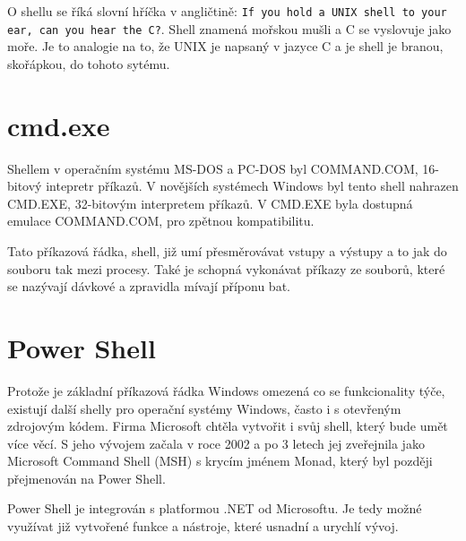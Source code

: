 \documentclass[thesis=M,czech]{FITthesis}[2012/06/26]
\begin{document}
O shellu se říká slovní hříčka v angličtině: \texttt{If you hold a UNIX shell to your ear, can you hear the C?}. Shell znamená mořskou mušli a C se vyslovuje jako moře. Je to analogie na to, že UNIX je napsaný v jazyce C a je shell je branou, skořápkou, do tohoto sytému.






\section{cmd.exe}

Shellem v operačním systému MS-DOS a PC-DOS byl COMMAND.COM, 16-bitový intepretr příkazů. V novějších systémech Windows byl tento shell nahrazen CMD.EXE, 32-bitovým interpretem příkazů. V CMD.EXE byla dostupná emulace COMMAND.COM, pro zpětnou kompatibilitu.

Tato příkazová řádka, shell, již umí přesměrovávat vstupy a výstupy a to jak do souboru tak mezi procesy. Také je schopná vykonávat příkazy ze souborů, které se nazývají dávkové a zpravidla mívají příponu bat.



\section{Power Shell}

Protože je základní příkazová řádka Windows omezená co se funkcionality týče, existují další shelly pro operační systémy Windows, často i s otevřeným zdrojovým kódem. Firma Microsoft chtěla vytvořit i svůj shell, který bude umět více věcí. S jeho vývojem začala v roce 2002 a po 3 letech jej zveřejnila jako Microsoft Command Shell (MSH) s krycím jménem Monad, který byl později přejmenován na Power Shell.

Power Shell je integrován s platformou .NET od Microsoftu. Je tedy možné využívat již vytvořené funkce a nástroje, které usnadní a urychlí vývoj.
\end{document}
